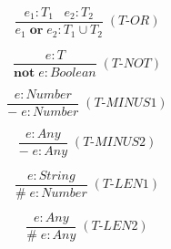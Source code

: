 \documentclass[12pt]{article}
\begin{document}
\[
\frac{e_{1}:T_{1} \;\;\; e_{2}:T_{2}}
     {e_{1} \; \textbf{or} \; e_{2} : T_{1} \cup T_{2}} \; (\textit{T-OR})
\]

\[
\frac{e:T}
     {\textbf{not} \; e : Boolean} \; (\textit{T-NOT})
\]

\[
\frac{e:Number}
     {- \; e : Number} \; (\textit{T-MINUS1})
\]

\[
\frac{e:Any}
     {- \; e : Any} \; (\textit{T-MINUS2})
\]

\[
\frac{e : String}
     {\# \; e : Number} \; (\textit{T-LEN1})
\]

\[
\frac{e : Any}
     {\# \; e : Any} \; (\textit{T-LEN2})
\]
\end{document}

